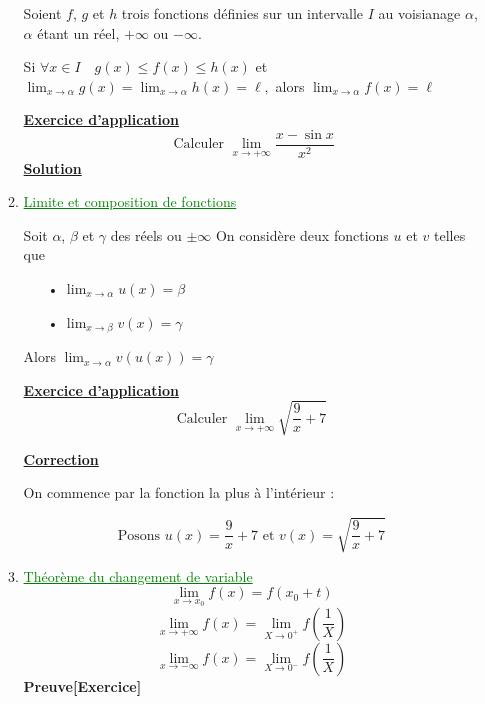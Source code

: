 \documentclass[12pt]{article}
\begin{document}
\begin{enumerate}[label=\arabic*)]
\begin{enumerate}[label=\alph*)]
Soient \( f \), \( g \) et \( h \) trois fonctions définies sur un intervalle \( I \) au voisianage \( \alpha \), \( \alpha \) étant un réel, \( +\infty \) ou \( -\infty \).

Si \( \forall x\in I \quad g(x) \leq f(x)\leq h(x) \) et \( \lim_{x \to \alpha}g(x)=\lim_{x \to \alpha}h(x)=\ell,\) alors \( \lim_{x \to \alpha}f(x)=\ell \)
       	
       	\textbf{\underline{Exercice d'application}}
\[\text{ Calculer } \lim_{ x\to +\infty} \frac{x-\sin x}{x^{2}} \]   	
       	\textbf{\underline{Solution}}
       	
\item \textcolor{green}{\underline{Limite et composition de fonctions}}

Soit \( \alpha \), \( \beta \) et \( \gamma \) des réels ou \( \pm\infty \) On considère deux fonctions \( u \) et \( v \) telles que
\begin{itemize}
\item[•] \( \lim_{x \to \alpha}u(x)=\beta  \)
\item[•] \( \lim_{x \to \beta}v(x)=\gamma \)
\end{itemize}

Alors \( \lim_{x \to \alpha}v(u(x))=\gamma \) 	
	
       	\textbf{\underline{Exercice d'application}}	
\[\text{Calculer }\lim_{x \to +\infty}\sqrt{\frac{9}{x}+7} \]

				\textbf{\underline{Correction}}
				
On commence par la fonction la plus à l'intérieur :

\[\text{Posons } u(x)=\frac{9}{x}+7 \text{ et } v(x)=\sqrt{\frac{9}{x}+7} \]
       	\item \textcolor{green}{\underline{Théorème du changement de variable}}
       	\[ \lim_{x \to x_{0}}f(x)=f(x_{0}+t) \]
      	\[ \lim_{x \to +\infty}f(x)=\lim_{X \to 0^{+}}f \left( \frac{1}{X} \right)  \]
       	\[ \lim_{x \to -\infty}f(x)=\lim_{X \to 0^{-}}f \left( \frac{1}{X} \right)  \]
       	\textbf{Preuve[Exercice]}    	
			       		
       	
       	
\end{enumerate}
		

\end{enumerate}
\end{document}
